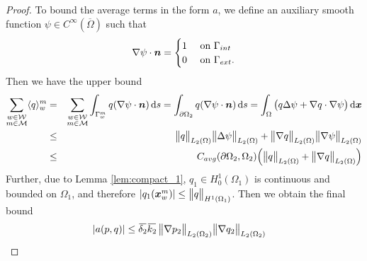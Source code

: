 \begin{proof}
To bound the average terms in the form $a$,
we define an auxiliary smooth function $\psi\in C^{\infty}(\overbar\Omega)$ such that
\begin{equation*}
  \nabla\psi\cdot\mathbf{\boldsymbol{n}} =
  \begin{cases}
    1 & \textrm{ on } \Gamma_{int}\\
    0 & \textrm{ on } \Gamma_{ext}.
  \end{cases} \nonumber
\end{equation*}
Then we have the upper bound
\begin{eqnarray}
  \sum_{\substack{w\in \mathcal{W} \\ m\in \mathcal{M}}} \langle q\rangle^m_w
    &=& \sum_{\substack{w\in \mathcal{W} \\ m\in \mathcal{M}}} \int_{\Gamma^m_w} q (\nabla\psi\cdot\mathbf{\boldsymbol{n}}) \,{\rm d} s
    = \int_{\partial\Omega_2} q (\nabla\psi\cdot\mathbf{\boldsymbol{n}}) \,{\rm d} s
    = \int_{\Omega} \big(q \Delta\psi + \nabla q \cdot\nabla\psi \big) \,{\rm d}\mathbf{\boldsymbol{x}} \nonumber\\
    &\leq& \bigl\Vert q\bigr\Vert_{L_2(\Omega)}\bigl\Vert\Delta\psi\bigr\Vert_{L_2(\Omega)} + \bigl\Vert\nabla q\bigr\Vert_{L_2(\Omega)} \bigl\Vert\nabla\psi\bigr\Vert_{L_2(\Omega)} \nonumber\\
    &\leq& C_{avg}(\partial\Omega_2, \Omega_2) \Big(\bigl\Vert q\bigr\Vert_{L_2(\Omega)} + \bigl\Vert\nabla q\bigr\Vert_{L_2(\Omega)}\Big)
\end{eqnarray}
Further, due to Lemma \ref{lem:compact_1}, $q_1\in H^1_0(\Omega_1)$ is continuous and bounded on $\Omega_1$,
and therefore $\left|q_1(\mathbf{\boldsymbol{x}}^m_w)\right|\leq \bigl\Vert q\bigr\Vert_{H^1(\Omega_1)}$.
Then we obtain the final bound
\begin{align} \label{eqn:prim_form_a_bound_proof}
    \abs{a(p,q)} &\leq \overbar{\delta_2}\overbar{k_2}\, \norm{\grad p_2}_{L_2(\Omega_2)} \norm{\grad q_2}_{L_2(\Omega_2)}

\end{align}
\end{proof}
